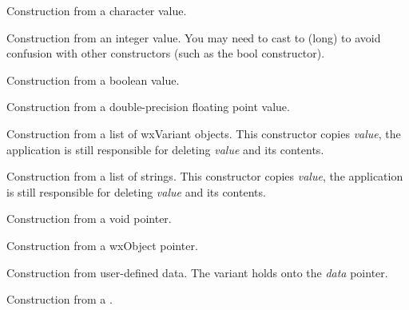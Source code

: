 
Construction from a character value.


Construction from an integer value. You may need to cast to (long) to
avoid confusion with other constructors (such as the bool constructor).


Construction from a boolean value.


Construction from a double-precision floating point value.


Construction from a list of wxVariant objects. This constructor
copies {\it value}, the application is still responsible for
deleting {\it value} and its contents.


Construction from a list of strings. This constructor
copies {\it value}, the application is still responsible for
deleting {\it value} and its contents.


Construction from a void pointer.


Construction from a wxObject pointer.


Construction from user-defined data.  The variant holds onto the {\it data} pointer.


Construction from a .  


